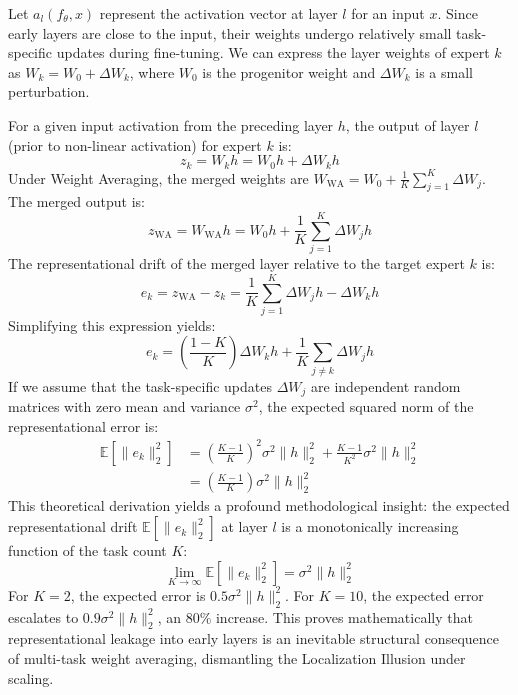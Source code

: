 \documentclass{article}
\theoremstyle{plain}
\theoremstyle{definition}
\theoremstyle{remark}
\begin{document}
Let $a_l(f_{\theta}, x)$ represent the activation vector at layer $l$ for an input $x$. Since early layers are close to the input, their weights undergo relatively small task-specific updates during fine-tuning. We can express the layer weights of expert $k$ as $W_k = W_0 + \Delta W_k$, where $W_0$ is the progenitor weight and $\Delta W_k$ is a small perturbation.

For a given input activation from the preceding layer $h$, the output of layer $l$ (prior to non-linear activation) for expert $k$ is:
\begin{equation}
z_k = W_k h = W_0 h + \Delta W_k h
\end{equation}
Under Weight Averaging, the merged weights are $W_{\text{WA}} = W_0 + \frac{1}{K}\sum_{j=1}^K \Delta W_j$. The merged output is:
\begin{equation}
z_{\text{WA}} = W_{\text{WA}} h = W_0 h + \frac{1}{K} \sum_{j=1}^K \Delta W_j h
\end{equation}
The representational drift of the merged layer relative to the target expert $k$ is:
\begin{equation}
e_{k} = z_{\text{WA}} - z_k = \frac{1}{K} \sum_{j=1}^K \Delta W_j h - \Delta W_k h
\end{equation}
Simplifying this expression yields:
\begin{equation}
e_{k} = \left( \frac{1-K}{K} \right) \Delta W_k h + \frac{1}{K} \sum_{j \neq k} \Delta W_j h
\end{equation}
If we assume that the task-specific updates $\Delta W_j$ are independent random matrices with zero mean and variance $\sigma^2$, the expected squared norm of the representational error is:
\begin{align}
\mathbb{E}[\|e_k\|_2^2] &= \left( \frac{K-1}{K} \right)^2 \sigma^2 \|h\|_2^2 + \frac{K-1}{K^2} \sigma^2 \|h\|_2^2 \nonumber \\
&= \left( \frac{K-1}{K} \right) \sigma^2 \|h\|_2^2
\end{align}
This theoretical derivation yields a profound methodological insight: the expected representational drift $\mathbb{E}[\|e_k\|_2^2]$ at layer $l$ is a monotonically increasing function of the task count $K$:
\begin{equation}
\lim_{K \to \infty} \mathbb{E}[\|e_k\|_2^2] = \sigma^2 \|h\|_2^2
\end{equation}
For $K=2$, the expected error is $0.5 \sigma^2 \|h\|_2^2$. For $K=10$, the expected error escalates to $0.9 \sigma^2 \|h\|_2^2$, an 80\% increase. This proves mathematically that representational leakage into early layers is an inevitable structural consequence of multi-task weight averaging, dismantling the Localization Illusion under scaling.
\end{document}

